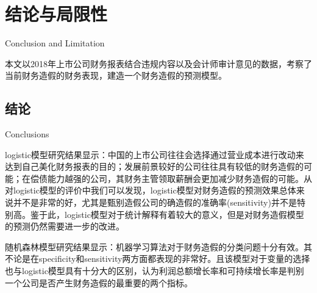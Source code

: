 \chapter{结论与局限性}{Conclusion and Limitation}



本文以2018年上市公司财务报表结合违规内容以及会计师审计意见的数据，考察了当前财务造假的财务表现，建造一个财务造假的预测模型。

\section{结论}{Conclusions}

logistic模型研究结果显示：中国的上市公司往往会选择通过营业成本进行改动来达到自己美化财务报表的目的；发展前景较好的公司往往具有较低的财务造假的可能；在偿债能力越强的公司，其财务主管领取薪酬会更加减少财务造假的可能。从对logistic模型的评价中我们可以发现，logistic模型对财务造假的预测效果总体来说并不是非常的好，尤其是甄别造假公司的确造假的准确率(sensitivity)并不是特别高。鉴于此，logistic模型对于统计解释有着较大的意义，但是对财务造假模型的预测仍然需要进一步的改进。

随机森林模型研究结果显示：机器学习算法对于财务造假的分类问题十分有效。其不论是在specificity和sensitivity两方面都表现的非常好。且该模型对于变量的选择也与logistic模型具有十分大的区别，认为利润总额增长率和可持续增长率是判别一个公司是否产生财务造假的最重要的两个指标。

